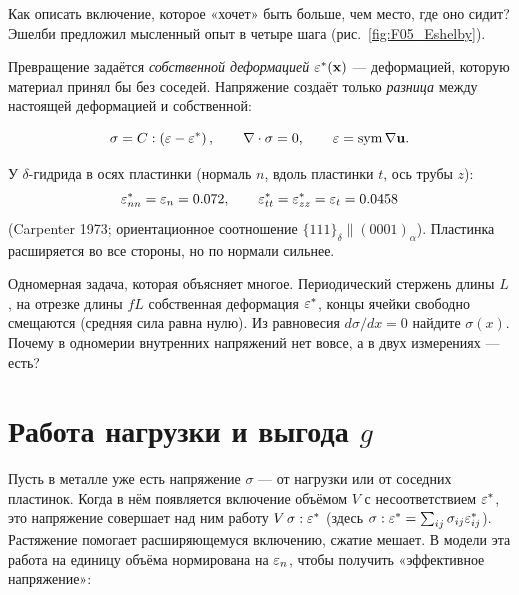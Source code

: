 Как описать включение, которое «хочет» быть больше, чем место, где оно сидит? Эшелби предложил
мысленный опыт в четыре шага (рис.~\ref{fig:F05_Eshelby}).


Превращение задаётся \emph{собственной деформацией} $\varepsilon^*(\mathbf x)$ --- деформацией, которую
материал принял бы без соседей. Напряжение создаёт только \emph{разница} между настоящей
деформацией и собственной:
\begin{keyf}
\[
\sigma=C:\left(\varepsilon-\varepsilon^*\right),\qquad \nabla\cdot\sigma=0,\qquad \varepsilon=\operatorname{sym}\nabla\mathbf u .
\]
\end{keyf}
У $\delta$-гидрида в осях пластинки (нормаль $n$, вдоль пластинки $t$, ось трубы $z$):
\begin{equation}
\varepsilon^*_{nn}=\varepsilon_n=0.072,\qquad \varepsilon^*_{tt}=\varepsilon^*_{zz}=\varepsilon_t=0.0458
\end{equation}
(Carpenter 1973; ориентационное соотношение $\{111\}_\delta\parallel(0001)_\alpha$). Пластинка
расширяется во все стороны, но по нормали сильнее.

\begin{exercise}
Одномерная задача, которая объясняет многое. Периодический стержень длины $L$, на отрезке
длины $fL$ собственная деформация $\varepsilon^*$, концы ячейки свободно смещаются (средняя сила
равна нулю). Из равновесия $d\sigma/dx=0$ найдите $\sigma(x)$. Почему в одномерии внутренних
напряжений нет вовсе, а в двух измерениях --- есть?
\end{exercise}

\section{Работа нагрузки и выгода $g$}

Пусть в металле уже есть напряжение $\sigma$ --- от нагрузки или от соседних пластинок. Когда в
нём появляется включение объёмом $V$ с несоответствием $\varepsilon^*$, это напряжение совершает над
ним работу $V\,\sigma:\varepsilon^*$ (здесь $\sigma:\varepsilon^*=\sum_{ij}\sigma_{ij}\varepsilon^*_{ij}$). Растяжение
помогает расширяющемуся включению, сжатие мешает. В модели эта работа на единицу объёма
нормирована на $\varepsilon_n$, чтобы получить «эффективное напряжение»:

